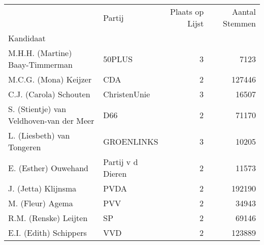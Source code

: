 \begin{tabular}{llrr}
\toprule
{} &                 Partij &  Plaats op Lijst &  Aantal Stemmen  \\
Kandidaat                                &                        &                  &                           \\
\midrule
M.H.H. (Martine) Baay-Timmerman          &                 50PLUS &                3 &                      7123 \\
M.C.G. (Mona) Keijzer                    &                    CDA &                2 &                    127446 \\
C.J. (Carola) Schouten                   &           ChristenUnie &                3 &                     16507 \\
S. (Stientje) van Veldhoven-van der Meer &                    D66 &                2 &                     71170 \\
L. (Liesbeth) van Tongeren               &             GROENLINKS &                3 &                     10205 \\
E. (Esther) Ouwehand                     &  Partij v d Dieren &                2 &                     11573 \\
J. (Jetta) Klijnsma                      &                   PVDA &                2 &                    192190 \\
M. (Fleur) Agema                         &                    PVV &                2 &                     34943 \\
R.M. (Renske) Leijten                    &                     SP &                2 &                     69146 \\
E.I. (Edith) Schippers                   &                    VVD &                2 &                    123889 \\
\bottomrule
\end{tabular}
